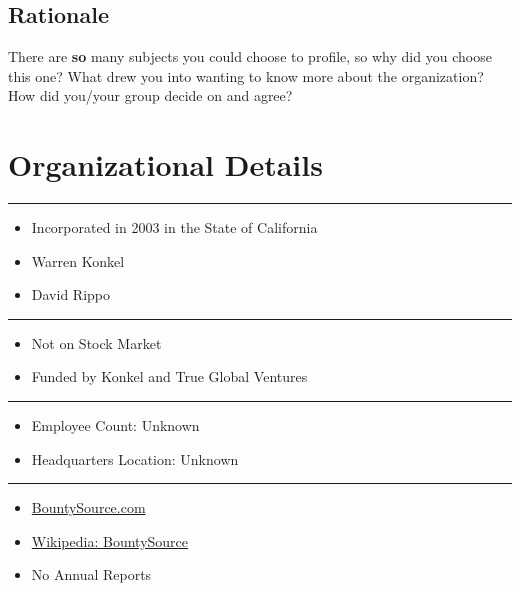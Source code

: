 \subsection{Rationale}\label{rationale}

There are \textbf{so} many subjects you could choose to profile, so why
did you choose this one? What drew you into wanting to know more about
the organization? How did you/your group decide on and agree?

\section{Organizational Details}\label{organizational-details}

\begin{center}\rule{3in}{0.4pt}\end{center}

\begin{itemize}
\itemsep1pt\parskip0pt
\item
  Incorporated in 2003 in the State of California
\item
  Warren Konkel
\item
  David Rippo
\end{itemize}

\begin{center}\rule{3in}{0.4pt}\end{center}

\begin{itemize}
\itemsep1pt\parskip0pt
\item
  Not on Stock Market
\item
  Funded by Konkel and True Global Ventures
\end{itemize}

\begin{center}\rule{3in}{0.4pt}\end{center}

\begin{itemize}
\itemsep1pt\parskip0pt
\item
  Employee Count: Unknown
\item
  Headquarters Location: Unknown
\end{itemize}

\begin{center}\rule{3in}{0.4pt}\end{center}

\begin{itemize}
\itemsep1pt\parskip0pt
\item
  \href{https://bountysource.com}{BountySource.com}
\item
  \href{http://en.wikipedia.org/wiki/Bountysource}{Wikipedia:
  BountySource}
\item
  No Annual Reports
\end{itemize}

